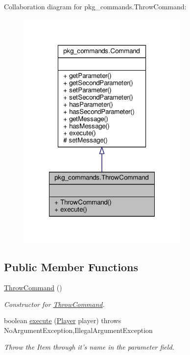 Collaboration diagram for pkg\-\_\-commands.\-Throw\-Command\-:
\nopagebreak
\begin{figure}[H]
\begin{center}
\leavevmode
\includegraphics[width=240pt]{classpkg__commands_1_1ThrowCommand__coll__graph}
\end{center}
\end{figure}
\subsection*{Public Member Functions}
\begin{DoxyCompactItemize}
\item 
\hyperlink{classpkg__commands_1_1ThrowCommand_a3332c8c15bf1a0a4ce85814406dbbfa6}{Throw\-Command} ()
\begin{DoxyCompactList}\small\item\em Constructor for \hyperlink{classpkg__commands_1_1ThrowCommand}{Throw\-Command}. \end{DoxyCompactList}\item 
boolean \hyperlink{classpkg__commands_1_1ThrowCommand_a38d936bcebcf45936324caf0f417b012}{execute} (\hyperlink{classpkg__world_1_1Player}{Player} player)  throws No\-Argument\-Exception,\-Illegal\-Argument\-Exception 
\begin{DoxyCompactList}\small\item\em Throw the Item through it's name in the parameter field. \end{DoxyCompactList}\end{DoxyCompactItemize}
